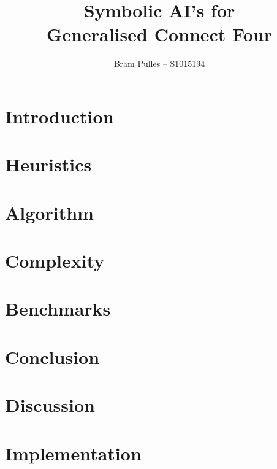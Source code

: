 \documentclass[a4paper]{article}
\author{Bram Pulles -- S1015194}
\title{\textbf{Symbolic AI's for\\ Generalised Connect Four}}
\begin{document}
\maketitle

\tableofcontents

\pagebreak
\section{Introduction}

\section{Heuristics}

\section{Algorithm}

\section{Complexity}

\section{Benchmarks}
\begin{table}[h]
	\begin{adjustbox}{center}
	\end{adjustbox}
\end{table}

\section{Conclusion}

\section{Discussion}




\appendix
\section{Implementation}
\end{document}
